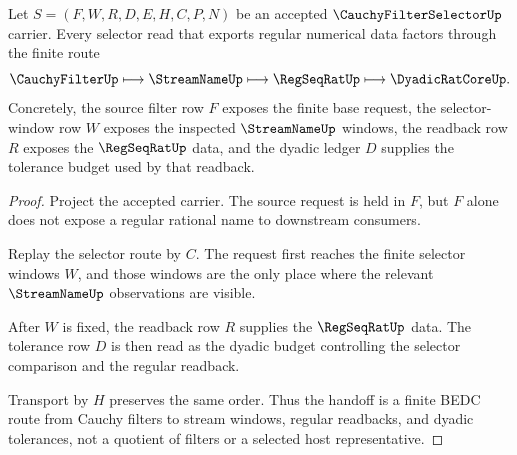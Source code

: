 \begin{theorem}
\label{thm:cauchy-filter-selector-regseqrat-handoff}
Let $S=(F,W,R,D,E,H,C,P,N)$ be an accepted $\CauchyFilterSelectorUp$ carrier. Every selector read that exports regular numerical data factors through the finite route
$$
\CauchyFilterUp \longmapsto \StreamNameUp \longmapsto \RegSeqRatUp \longmapsto \DyadicRatCoreUp .
$$
Concretely, the source filter row $F$ exposes the finite base request, the selector-window row $W$ exposes the inspected $\StreamNameUp$ windows, the readback row $R$ exposes the $\RegSeqRatUp$ data, and the dyadic ledger $D$ supplies the tolerance budget used by that readback.
\end{theorem}
\begin{proof}
Project the accepted carrier. The source request is held in $F$, but $F$ alone does not expose a regular rational name to downstream consumers.

Replay the selector route by $C$. The request first reaches the finite selector windows $W$, and those windows are the only place where the relevant $\StreamNameUp$ observations are visible.

After $W$ is fixed, the readback row $R$ supplies the $\RegSeqRatUp$ data. The tolerance row $D$ is then read as the dyadic budget controlling the selector comparison and the regular readback.

Transport by $H$ preserves the same order. Thus the handoff is a finite BEDC route from Cauchy filters to stream windows, regular readbacks, and dyadic tolerances, not a quotient of filters or a selected host representative.
\end{proof}


